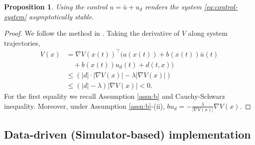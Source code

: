 \documentclass[10pt,a4paper]{amsart}
\newtheorem{proposition}{Proposition}
\newcommand{\tp}{^\top}
\newcommand{\grad}{\nabla}
\begin{document}


\begin{proposition}
Using the control $u = \bar{u} + u_d$ renders the system \eqref{eq:control-system} asymptotically stable. 
\end{proposition}

\begin{proof}
We follow the method in \cite[Chapter 14.2]{khalil}. 
Taking the derivative of $V$ along system trajectories, 
\begin{align*}
\dot{V}(x) &= \grad V (x(t)) \tp \bigg( a(x(t)) + b(x(t))\bar{u}(t) \\ & \quad + b(x(t))u_d(t) + d(t,x) \bigg) \\
& \le  (| d | \cdot | \grad V(x)| -\lambda |\grad V (x)|) \\
& \le (|d| - \lambda ) |\grad V (x)| < 0.
\end{align*}
For the first equality we recall Assumption \ref{assn:b} and Cauchy-Schwarz inequality. 
Moreover, under Assumption \ref{assn:b}-(ii), $bu_d = - \frac{\lambda}{| \grad V(x)|} \grad V(x)$.
\end{proof}



\subsection{Data-driven (Simulator-based) implementation}
\end{document}
